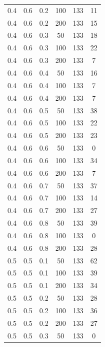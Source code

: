 \documentclass[a4paper,14pt, unknownkeysallowed]{extreport}
\begin{document}
\begin{center}
\begin{longtable}[c]{|c|c|c|c|c|c|}
         0.4 &  0.6 &  0.2 &  100 &   133 &    11 \\
         0.4 &  0.6 &  0.2 &  200 &   133 &    15 \\
        \hline
         0.4 &  0.6 &  0.3 &   50 &   133 &    18 \\
         0.4 &  0.6 &  0.3 &  100 &   133 &    22 \\
         0.4 &  0.6 &  0.3 &  200 &   133 &     7 \\
        \hline
         0.4 &  0.6 &  0.4 &   50 &   133 &    16 \\
         0.4 &  0.6 &  0.4 &  100 &   133 &     7 \\
         0.4 &  0.6 &  0.4 &  200 &   133 &     7 \\
        \hline
         0.4 &  0.6 &  0.5 &   50 &   133 &    38 \\
         0.4 &  0.6 &  0.5 &  100 &   133 &    22 \\
         0.4 &  0.6 &  0.5 &  200 &   133 &    23 \\
        \hline
         0.4 &  0.6 &  0.6 &   50 &   133 &     0 \\
         0.4 &  0.6 &  0.6 &  100 &   133 &    34 \\
         0.4 &  0.6 &  0.6 &  200 &   133 &     7 \\
        \hline
         0.4 &  0.6 &  0.7 &   50 &   133 &    37 \\
         0.4 &  0.6 &  0.7 &  100 &   133 &    14 \\
         0.4 &  0.6 &  0.7 &  200 &   133 &    27 \\
        \hline
         0.4 &  0.6 &  0.8 &   50 &   133 &    39 \\
         0.4 &  0.6 &  0.8 &  100 &   133 &     0 \\
         0.4 &  0.6 &  0.8 &  200 &   133 &    28 \\
        \hline
         0.5 &  0.5 &  0.1 &   50 &   133 &    62 \\
         0.5 &  0.5 &  0.1 &  100 &   133 &    39 \\
         0.5 &  0.5 &  0.1 &  200 &   133 &    34 \\
        \hline
         0.5 &  0.5 &  0.2 &   50 &   133 &    28 \\
         0.5 &  0.5 &  0.2 &  100 &   133 &    36 \\
         0.5 &  0.5 &  0.2 &  200 &   133 &    27 \\
        \hline
         0.5 &  0.5 &  0.3 &   50 &   133 &     0 \\

\end{longtable}
\end{center}
\end{document}
